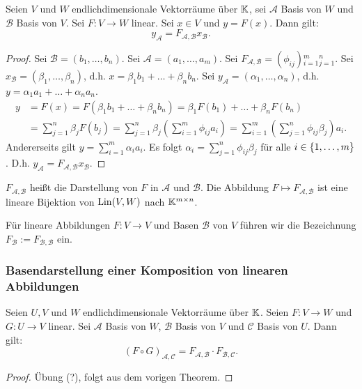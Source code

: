 \begin{thm}
	Seien $ V $ und $ W $ endlichdimensionale Vektorräume über $ \mathbb K $, sei $ \mathcal{A} $ Basis von $ W $ und $ \mathcal{B} $ Basis von $ V $. Sei $ F : V \to W $ linear. Sei $ x \in V $ und $ y = F(x) $. Dann gilt:
	\begin{equation}
		y_\mathcal{A} = F_\mathcal{A,B} x_\mathcal{B}.
	\end{equation}
\end{thm}
\begin{proof}
	Sei $ \mathcal{B} = (b_1, \ldots, b_n) $. Sei $ \mathcal{A} = (a_1, \ldots, a_m) $. Sei $ F_{\mathcal{A},\mathcal{B}} = (\phi_{ij}){}_{i=1}^m{}_{j=1}^n $. Sei $ x_\mathcal{B} = (\beta_1, \ldots, \beta_n) $, d.h. $ x = \beta_1b_1 + \ldots + \beta_nb_n $. Sei $ y_\mathcal{A} = (\alpha_1, \ldots, \alpha_n) $, d.h. $ y = \alpha_1a_1 + \ldots + \alpha_na_n $.
	\begin{align*}
		y &= F(x) = F(\beta_1b_1 + \ldots + \beta_nb_n) = \beta_1F(b_1) + \ldots + \beta_nF(b_n) \\
		&= \sum\limits_{j=1}^{n} \beta_j F(b_j) = \sum\limits_{j=1}^{n} \beta_j \left( \sum\limits_{i=1}^{m} \phi_{ij}a_i \right) = \sum\limits_{i=1}^{m} \left( \sum\limits_{j=1}^{n} \phi_{ij}\beta_j \right) a_i.
	\end{align*}
	Andererseits gilt $ y = \sum_{i=1}^m \alpha_ia_i $. Es folgt $ \alpha_i = \sum_{j=1}^{n} \phi_{ij}\beta_j $ für alle $ i \in \{ 1,\ldots,m \} $. D.h. $ y_\mathcal{A} = F_\mathcal{A,B} x_\mathcal{B} $.
\end{proof}

$ F_{\mathcal{A},\mathcal{B}} $ heißt die Darstellung von $ F $ in $ \mathcal{A} $ und $ \mathcal{B} $. Die Abbildung $ F \mapsto F_{\mathcal{A},\mathcal{B}} $ ist eine lineare Bijektion von $ \operatorname{Lin}(V,W) $ nach $ \mathbb K^{m \times n} $.

Für lineare Abbildungen $ F : V \to V $ und Basen $ \mathcal{B} $ von $ V $ führen wir die Bezeichnung $ F_\mathcal{B} := F_\mathcal{B,B} $ ein.

\subsubsection{Basendarstellung einer Komposition von linearen Abbildungen}

\begin{thm}
	Seien $ U, V $ und $ W $ endlichdimensionale Vektorräume über $ \mathbb K $. Seien $ F : V \to W $ und $ G : U \to V $ linear. Sei $ \mathcal{A} $ Basis von $ W $, $ \mathcal{B} $ Basis von $ V $ und $ \mathcal{C} $ Basis von $ U $. Dann gilt:
	\begin{equation}
		(F \circ G)_\mathcal{A,C} = F_\mathcal{A,B} \cdot F_\mathcal{B,C}.
	\end{equation}
\end{thm}
\begin{proof}
	Übung (?), folgt aus dem vorigen Theorem.
\end{proof}

